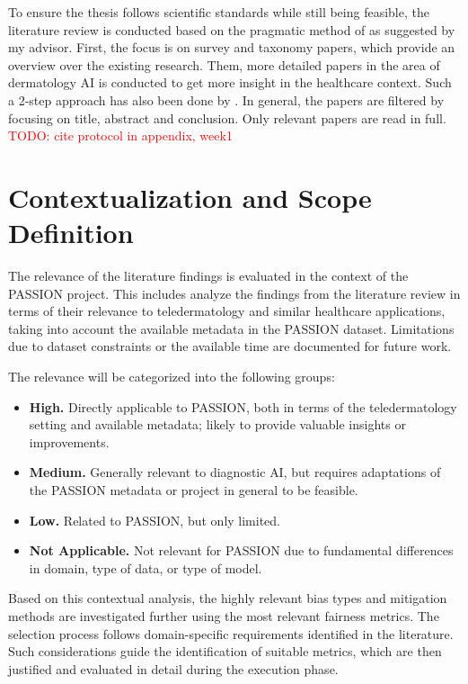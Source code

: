 \documentclass[12pt, a4paper, oneside]{book}   	%
\renewcommand{\todo}[1]{\textcolor{red}{TODO: #1}}
\begin{document}
		To ensure the thesis follows scientific standards while still being feasible, the literature review is conducted based on the pragmatic method of \textcite{Alake_2021} as suggested by my advisor. First, the focus is on survey and taxonomy papers, which provide an overview over the existing research. Them, more detailed papers in the area of dermatology \gls{AI} is conducted to get more insight in the healthcare context. Such a 2-step approach has also been done by \textcite{Chen_2024}. In general, the papers are filtered by focusing on title, abstract and conclusion. Only relevant papers are read in full. \todo{cite protocol in appendix, week1}
		
		\section{Contextualization and Scope Definition} \label{chap:contextMethod}
		The relevance of the literature findings is evaluated in the context of the PASSION project. This includes analyze the findings from the literature review in terms of their relevance to \gls{teledermatology} and similar healthcare applications, taking into account the available metadata in the PASSION dataset. Limitations due to dataset constraints or the available time are documented for future work.
		
		The relevance will be categorized into the following groups:
		\begin{itemize}
			\item \textbf{High.} Directly applicable to PASSION, both in terms of the \gls{teledermatology} setting and available metadata; likely to provide valuable insights or improvements. 
			\item \textbf{Medium.} Generally relevant to diagnostic \gls{AI}, but requires adaptations of the PASSION metadata or project in general to be feasible.
			\item \textbf{Low.} Related to PASSION, but only limited.
			\item \textbf{Not Applicable.} Not relevant for PASSION due to fundamental differences in domain, type of data, or type of model.
		\end{itemize}
		
		Based on this contextual analysis, the highly relevant bias types and mitigation methods are investigated further using the most relevant fairness metrics. The selection process follows domain-specific requirements identified in the literature. Such considerations guide the identification of suitable metrics, which are then justified and evaluated in detail during the execution phase.
		
\end{document}
